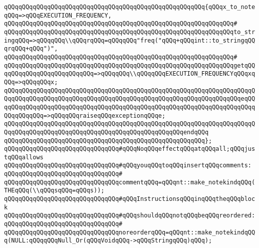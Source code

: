 \verb|qQQqqQQqqQQqqQQqqQQqqQQqqQQqqQQqqQQqqQQqqQQqqQQqqQQqqQQq{qQQqx_to_noteqQQq=>qQQqEXECUTION_FREQUENCY,|\newline
\verb|qQQqqQQqqQQqqQQqqQQqqQQqqQQqqQQqqQQqqQQqqQQqqQQqqQQqqQQqqQQqqQQq#|\newline
\verb|qQQqqQQqqQQqqQQqqQQqqQQqqQQqqQQqqQQqqQQqqQQqqQQqqQQqqQQqqQQqqQQqto_stringqQQq=>qQQqqQQq\\qQQqrqQQq=qQQqqQQq"freq("qQQq+qQQqint::to_stringqQQqrqQQq+qQQq")",|\newline
\verb|qQQqqQQqqQQqqQQqqQQqqQQqqQQqqQQqqQQqqQQqqQQqqQQqqQQqqQQqqQQqqQQq#|\newline
\verb|qQQqqQQqqQQqqQQqqQQqqQQqqQQqqQQqqQQqqQQqqQQqqQQqqQQqqQQqqQQqqQQqgetqQQqqQQqqQQqqQQqqQQqqQQqqQQq=>qQQqqQQq\\qQQqqQQqEXECUTION_FREQUENCYqQQqxqQQq=>qQQqqQQqx;|\newline
\verb|qQQqqQQqqQQqqQQqqQQqqQQqqQQqqQQqqQQqqQQqqQQqqQQqqQQqqQQqqQQqqQQqqQQqqQQqqQQqqQQqqQQqqQQqqQQqqQQqqQQqqQQqqQQqqQQqqQQqqQQqqQQqqQQqqQQqqQQqeqQQqqQQqqQQqqQQqqQQqqQQqqQQqqQQqqQQqqQQqqQQqqQQqqQQqqQQqqQQqqQQqqQQqqQQqqQQqqQQqqQQq=>qQQqqQQqraiseqQQqexceptionqQQqe;|\newline
\verb|qQQqqQQqqQQqqQQqqQQqqQQqqQQqqQQqqQQqqQQqqQQqqQQqqQQqqQQqqQQqqQQqqQQqqQQqqQQqqQQqqQQqqQQqqQQqqQQqqQQqqQQqqQQqqQQqqQQqqQQqendqQQq|\newline
\verb|qQQqqQQqqQQqqQQqqQQqqQQqqQQqqQQqqQQqqQQqqQQqqQQqqQQqqQQq};|\newline
\newline
\verb|qQQqqQQqqQQqqQQqqQQqqQQqqQQqqQQq#qQQqNoqQQqeffectqQQqatqQQqall;qQQqjustqQQqallows|\newline
\verb|qQQqqQQqqQQqqQQqqQQqqQQqqQQqqQQq#qQQqyouqQQqtoqQQqinsertqQQqcomments:|\newline
\verb|qQQqqQQqqQQqqQQqqQQqqQQqqQQqqQQq#|\newline
\verb|qQQqqQQqqQQqqQQqqQQqqQQqqQQqqQQqcommentqQQq=qQQqnt::make_notekindqQQq(THEqQQq(\\qQQqsqQQq=qQQqs));|\newline
\newline
\verb|qQQqqQQqqQQqqQQqqQQqqQQqqQQqqQQq#qQQqInstructionsqQQqinqQQqtheqQQqblock|\newline
\verb|qQQqqQQqqQQqqQQqqQQqqQQqqQQqqQQq#qQQqshouldqQQqnotqQQqbeqQQqreordered:|\newline
\verb|qQQqqQQqqQQqqQQqqQQqqQQqqQQqqQQq#|\newline
\verb|qQQqqQQqqQQqqQQqqQQqqQQqqQQqqQQqnoreorderqQQq=qQQqnt::make_notekindqQQq(NULL:qQQqqQQqNull_Or(qQQqVoidqQQq->qQQqStringqQQq)qQQq);|\newline
